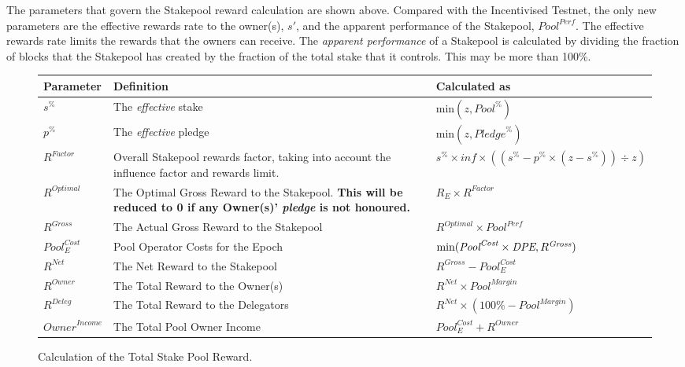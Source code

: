 \documentclass[11pt,a4paper,dvipsnames,twosided,final]{article}
\begin{document}
\noindent
The parameters that govern the Stakepool reward calculation are shown above.  Compared with the Incentivised
Testnet, the only new parameters are the effective rewards rate to the owner(s), $s'$, and the apparent performance of the Stakepool, $\textit{Pool}^{\textit{Perf}}$.
The effective rewards rate limits the rewards that the owners can receive.  The \emph{apparent performance} of a Stakepool is calculated
by dividing the fraction of blocks that the Stakepool has created by the fraction of the total stake that it controls.  This may be more than 100\%.

\begin{figure}[h!]
\begin{center}
\begin{tabular}{||l|p{6cm}|l||}
  \hline \hline
  \textbf{Parameter}  & \textbf{Definition} & \textbf{Calculated as} \\\hline
  $s^\%$ & The \emph{effective} stake & $\textrm{min} (z,{\textit{Pool}}^\%)$ \\\hline
  $p^\%$ & The \emph{effective} pledge  & $\textrm{min} (z,{\textit{Pledge}}^\%) $ \\\hline
  $\textit{R}^\textit{Factor}$ & Overall Stakepool rewards factor, taking into account the influence factor and rewards limit. & $s^\% \times \textit{inf} \times ((s^\% - p^\% \times (z - s^\%)) \div z)$ \\\hline
  $R^{Optimal}$ & The Optimal Gross Reward to the Stakepool.  \textbf{This will be reduced to 0 if any Owner(s)' \emph{pledge} is not honoured.} & $R_E \times \textit{R}^{Factor}$ \\\hline
$R^{\textit{Gross}}$ & The Actual Gross Reward to the Stakepool & $R^{Optimal} \times \textit{Pool}^{\textit{Perf}}$ \\\hline
${\textit{Pool}}^{\textit{Cost}}_E$ & Pool Operator Costs for the Epoch & $\textrm{min}(\textit{\textit{Pool}}^{\textit{Cost}} \times \textit{DPE},R^{\textit{Gross}})$ \\\hline
$R^{\textit{Net}}$  & The Net Reward to the Stakepool & $R^{\textit{Gross}} - {\textit{Pool}}^{\textit{Cost}}_E$ \\\hline
$R^{\textit{Owner}}$ & The Total Reward to the Owner(s) & $R^{\textit{Net}} \times {\textit{Pool}}^{\textit{Margin}} $ \\\hline
$R^{\textit{Deleg}}$ & The Total Reward to the Delegators & $R^{\textit{Net}} \times (100\% - {\textit{Pool}}^{\textit{Margin}})$ \\\hline
$\textit{Owner}^\textit{Income}$ & The Total Pool Owner Income & ${\textit{Pool}}^{\textit{Cost}}_E + R^{Owner}$ \\\hline
\hline
\end{tabular}
\end{center}
\caption{Calculation of the Total Stake Pool Reward.}
\end{figure}
\end{document}
